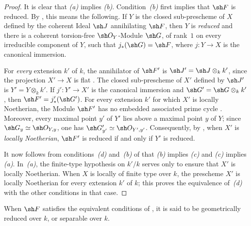 \begin{proof}
It is clear that \emph{(a)} implies \emph{(b)}.
Condition~\emph{(b)} first implies that $\sh F$ is reduced.
By , this means the following.
If $Y$ is the closed sub-prescheme of $X$ defined by the coherent
Ideal $\sh J$ annihilating $\sh F$, then $Y$ is \emph{reduced} and there is a
coherent torsion-free $\sh O_Y$-Module $\sh G$, of rank~$1$ on every
irreducible component of $Y$, such that
$j_*(\sh G)=\sh F$, where $j:Y\to X$ is the canonical immersion.

For \emph{every} extension $k'$ of $k$, the annihilator of $\sh F'$ is
$\sh J'=\sh J\otimes_k k'$, since the projection $X'\to X$ is flat
.
The closed sub-prescheme of $X'$ defined by $\sh J'$ is
$Y'=Y\otimes_k k'$.
If $j':Y'\to X'$ is the canonical immersion and
$\sh G'=\sh G\otimes_k k'$, then
$\sh F'=j'_*(\sh G')$.
For every extension $k'$ for which $X'$ is locally Noetherian, the
Module $\sh F'$ has no embedded associated prime cycle
.
Moreover, every maximal point $y'$ of $Y'$ lies above a maximal point
$y$ of $Y$; since
$\sh G_y\simeq\sh O_{Y,y}$, one has
$\sh G'_{y'}\simeq\sh O_{Y',y'}$.
Consequently, by , when $X'$ is \emph{locally Noetherian},
$\sh F'$ is reduced if and only if $Y'$ is reduced.

It now follows from conditions~\emph{(d)} and~\emph{(b)} of
 that \emph{(b)} implies \emph{(c)} and
\emph{(c)} implies \emph{(a)}.
In~\emph{(a)}, the finite-type hypothesis on $k'/k$ serves only to
ensure that $X'$ is locally Noetherian.
When $X$ is locally of finite type over $k$, the prescheme $X'$ is
locally Noetherian for every extension $k'$ of $k$; this proves the
equivalence of~\emph{(d)} with the other conditions in that case.
\end{proof}

\begin{definition}[4.6.17]
\label{IV.4.6.17}
When $\sh F$ satisfies the equivalent conditions of
, it is said to be geometrically reduced over
$k$, or separable over $k$.
\end{definition}

